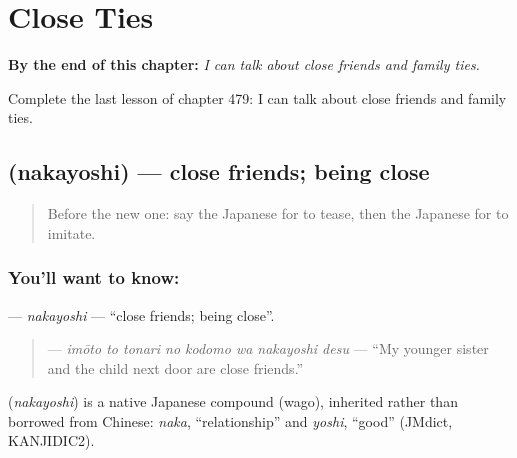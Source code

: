 
\chapter{Close Ties}
\label{ch:ja-close-ties}

\begin{chapteropening}
\textbf{By the end of this chapter:} \emph{I can talk about close friends and family ties.}

Complete the last lesson of chapter 479: I can talk about close friends and family ties.
\end{chapteropening}

\section[\texorpdfstring{\ja{なかよし} (nakayoshi)}{なかよし (nakayoshi)}]{ (nakayoshi) — close friends; being close}

\label{lesson:JA-C479-nakayoshi}



\begin{quote}
Before the new one: say the Japanese for to tease, then the Japanese for to imitate.
\end{quote}

\subsection*{You'll want to know: }
\textbf{} — \emph{nakayoshi} — \textquotedblleft{}close friends; being close\textquotedblright{}.

\begin{quote}
\textbf{   } — \emph{imōto to tonari no kodomo wa nakayoshi desu} — \textquotedblleft{}My younger sister and the child next door are close friends.\textquotedblright{}
\end{quote}

\begin{cousinweb}
\textbf{} (\emph{nakayoshi}) is a native Japanese compound (wago), inherited rather than borrowed from Chinese: \emph{naka}, \textquotedblleft{}relationship\textquotedblright{} and \emph{yoshi}, \textquotedblleft{}good\textquotedblright{} (JMdict, KANJIDIC2).
\end{cousinweb}

